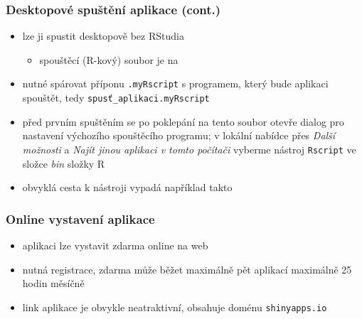 \documentclass[t]{beamer}
\begin{document}

\begin{frame}
  \frametitle{Desktopové spuštění aplikace (cont.)}
  \begin{itemize}
    \item lze ji spustit desktopově bez RStudia
    \begin{itemize}
      \item spouštěcí (\textsf{R}-kový) soubor je na
    \end{itemize}
  \end{itemize}
  \begin{center}
    \href{https://github.com/LStepanek/Vyvoj\_aplikaci\_v\_R/}{%
    }
  \end{center}
  \begin{itemize}
    \item nutné spárovat příponu \texttt{.myRscript} s programem, který
    bude aplikaci spouštět, tedy \texttt{spusť\_aplikaci.myRscript}
    \item před prvním spuštěním se po poklepání na tento soubor otevře
    dialog pro nastavení výchozího spouštěcího programu; v lokální nabídce
    přes \textit{Další možnosti} a \textit{Najít jinou aplikaci v tomto
    počítači} vyberme nástroj \texttt{Rscript} ve složce \textit{bin}
    složky \textsf{R}
    \item obvyklá cesta k nástroji vypadá například takto
  \end{itemize}
  \begin{center}
  \end{center}
\end{frame}



\begin{frame}
  \frametitle{Online vystavení aplikace}
  \begin{itemize}
    \item aplikaci lze vystavit zdarma online na web
  \end{itemize}
  \begin{center}
    \href{https://www.shinyapps.io/}{}
  \end{center}
  \begin{itemize}
    \item nutná registrace, zdarma může běžet maximálně pět aplikací
    maximálně 25 hodin měsíčně
    \item link aplikace je obvykle neatraktivní, obsahuje
    doménu \texttt{shinyapps.io}
  \end{itemize}
\end{frame}
\end{document}
